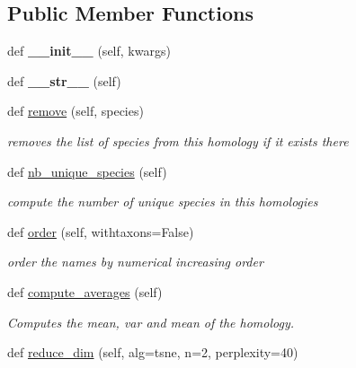 \subsection*{Public Member Functions}
\begin{DoxyCompactItemize}
\item 
\mbox{\label{class_py_c_u_b_1_1homology_1_1homology_a441a70cdc5814708841f5d3c29548203}} 
def {\bfseries \+\_\+\+\_\+init\+\_\+\+\_\+} (self, kwargs)
\item 
\mbox{\label{class_py_c_u_b_1_1homology_1_1homology_af27d98c4ced0023053744c7ba038b33a}} 
def {\bfseries \+\_\+\+\_\+str\+\_\+\+\_\+} (self)
\item 
def \mbox{\hyperlink{class_py_c_u_b_1_1homology_1_1homology_a32017c483bad9a5c4498640279a79634}{remove}} (self, species)
\begin{DoxyCompactList}\small\item\em removes the list of species from this homology if it exists there \end{DoxyCompactList}\item 
def \mbox{\hyperlink{class_py_c_u_b_1_1homology_1_1homology_ad430899a462da76cdd6e1fc6ee73e0ec}{nb\+\_\+unique\+\_\+species}} (self)
\begin{DoxyCompactList}\small\item\em compute the number of unique species in this homologies \end{DoxyCompactList}\item 
def \mbox{\hyperlink{class_py_c_u_b_1_1homology_1_1homology_a513d82c775ba47678304c97572eaf932}{order}} (self, withtaxons=False)
\begin{DoxyCompactList}\small\item\em order the names by numerical increasing order \end{DoxyCompactList}\item 
def \mbox{\hyperlink{class_py_c_u_b_1_1homology_1_1homology_aaeb164cd217a4746ff0082da1a92fc5e}{compute\+\_\+averages}} (self)
\begin{DoxyCompactList}\small\item\em Computes the mean, var and mean of the homology. \end{DoxyCompactList}\item 
def \mbox{\hyperlink{class_py_c_u_b_1_1homology_1_1homology_a3db21ba20b7720362cc19cc5b204eeab}{reduce\+\_\+dim}} (self, alg=\textquotesingle{}tsne\textquotesingle{}, n=2, perplexity=40)

\end{DoxyCompactItemize}
